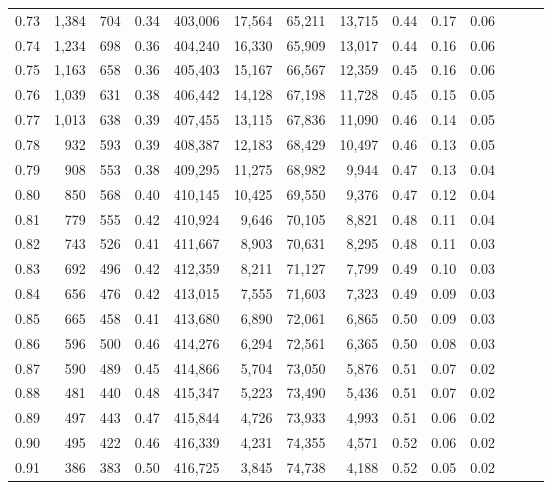 \begin{tabular}{rrrrrrrrrrrrrr}
0.73 &  1,384 &    704 &  0.34 &  403,006 &   17,564 &  65,211 &  13,715 &  0.44 &  0.17 &      0.06 \\
0.74 &  1,234 &    698 &  0.36 &  404,240 &   16,330 &  65,909 &  13,017 &  0.44 &  0.16 &      0.06 \\
0.75 &  1,163 &    658 &  0.36 &  405,403 &   15,167 &  66,567 &  12,359 &  0.45 &  0.16 &      0.06 \\
0.76 &  1,039 &    631 &  0.38 &  406,442 &   14,128 &  67,198 &  11,728 &  0.45 &  0.15 &      0.05 \\
0.77 &  1,013 &    638 &  0.39 &  407,455 &   13,115 &  67,836 &  11,090 &  0.46 &  0.14 &      0.05 \\
0.78 &    932 &    593 &  0.39 &  408,387 &   12,183 &  68,429 &  10,497 &  0.46 &  0.13 &      0.05 \\
0.79 &    908 &    553 &  0.38 &  409,295 &   11,275 &  68,982 &   9,944 &  0.47 &  0.13 &      0.04 \\
0.80 &    850 &    568 &  0.40 &  410,145 &   10,425 &  69,550 &   9,376 &  0.47 &  0.12 &      0.04 \\
0.81 &    779 &    555 &  0.42 &  410,924 &    9,646 &  70,105 &   8,821 &  0.48 &  0.11 &      0.04 \\
0.82 &    743 &    526 &  0.41 &  411,667 &    8,903 &  70,631 &   8,295 &  0.48 &  0.11 &      0.03 \\
0.83 &    692 &    496 &  0.42 &  412,359 &    8,211 &  71,127 &   7,799 &  0.49 &  0.10 &      0.03 \\
0.84 &    656 &    476 &  0.42 &  413,015 &    7,555 &  71,603 &   7,323 &  0.49 &  0.09 &      0.03 \\
0.85 &    665 &    458 &  0.41 &  413,680 &    6,890 &  72,061 &   6,865 &  0.50 &  0.09 &      0.03 \\
0.86 &    596 &    500 &  0.46 &  414,276 &    6,294 &  72,561 &   6,365 &  0.50 &  0.08 &      0.03 \\
0.87 &    590 &    489 &  0.45 &  414,866 &    5,704 &  73,050 &   5,876 &  0.51 &  0.07 &      0.02 \\
0.88 &    481 &    440 &  0.48 &  415,347 &    5,223 &  73,490 &   5,436 &  0.51 &  0.07 &      0.02 \\
0.89 &    497 &    443 &  0.47 &  415,844 &    4,726 &  73,933 &   4,993 &  0.51 &  0.06 &      0.02 \\
0.90 &    495 &    422 &  0.46 &  416,339 &    4,231 &  74,355 &   4,571 &  0.52 &  0.06 &      0.02 \\
0.91 &    386 &    383 &  0.50 &  416,725 &    3,845 &  74,738 &   4,188 &  0.52 &  0.05 &      0.02 \\

\end{tabular}
